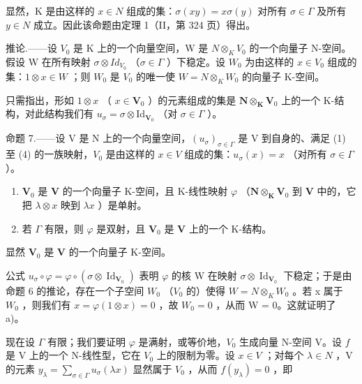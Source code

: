 显然，K 是由这样的 \(x \in N\) 组成的集：\(\sigma(xy) = x\sigma(y)\) 对所有 \(\sigma \in \Gamma\) 及所有 \(y \in N\) 成立。因此该命题由定理 1（II，第 324 页）得出。

推论.——设 \(V_{0}\) 是 K 上的一个向量空间，W 是 \(N \otimes_{K} V_{0}\) 的一个向量子 N-空间。假设 W 在所有映射 \(\sigma \otimes Id_{V_{0}}\) （\(\sigma \in \Gamma\) ）下稳定。设 \(W_{0}\) 为由这样的 \(x \in V_{0}\) 组成的集：\(1 \otimes x \in W\) ；则 \(W_{0}\) 是 \(V_{0}\) 的唯一使 \(W = N \otimes_{K} W_{0}\) 的向量子 K-空间。

只需指出，形如 \(1 \otimes x\) （ \(x \in \mathbf{V}_0\) ）的元素组成的集是 \(\mathbf{N} \otimes_{\mathbf{K}} \mathbf{V}_0\) 上的一个 K-结构，对此结构我们有 \(u_\sigma = \sigma \otimes \mathrm{Id}_{\mathbf{V}_0}\) （对 \(\sigma \in \Gamma\) ）。

命题 7.——设 V 是 N 上的一个向量空间，\((u_{\sigma})_{\sigma \in \Gamma}\) 是 V 到自身的、满足 (1) 至 (4) 的一族映射，\(V_{0}\) 是由这样的 \(x \in V\) 组成的集：\(u_{\sigma}(x) = x\) （对所有 \(\sigma \in \Gamma\) ）。

\begin{enumerate}
\def\labelenumi{\alph{enumi})}
\item
  \(\mathbf{V}_0\) 是 \(\mathbf{V}\) 的一个向量子 K-空间，且 K-线性映射 \(\varphi\) （\(\mathbf{N} \otimes_{\mathbf{K}} \mathbf{V}_0\) 到 \(\mathbf{V}\) 中的，它把 \(\lambda \otimes x\) 映到 \(\lambda x\) ）是单射。
\item
  若 \(\Gamma\) 有限，则 \(\varphi\) 是双射，且 \(\mathbf{V}_0\) 是 \(\mathbf{V}\) 上的一个 K-结构。
\end{enumerate}

显然 \(\mathbf{V}_0\) 是 \(\mathbf{V}\) 的一个向量子 K-空间。

公式 \(u_{\sigma} \circ \varphi = \varphi \circ (\sigma \otimes \operatorname{Id}_{\mathbf{V}_{0}})\) 表明 \(\varphi\) 的核 W 在映射 \(\sigma \otimes \operatorname{Id}_{\mathbf{V}_{0}}\) 下稳定；于是由命题 6 的推论，存在一个子空间 \(W_{0}\) （\(V_{0}\) 的）使得 \(W = N \otimes_{K} W_{0}\) 。若 x 属于 \(W_{0}\) ，则我们有 \(x = \varphi(1 \otimes x) = 0\) ，故 \(W_{0} = 0\) ，从而 W = 0。这就证明了 a)。

现在设 \(\Gamma\) 有限；我们要证明 \(\varphi\) 是满射，或等价地，\(V_0\) 生成向量 N-空间 V。设 \(f\) 是 V 上的一个 N-线性型，它在 \(V_0\) 上的限制为零。设 \(x \in V\) ；对每个 \(\lambda \in N\) ，V 的元素 \(y_\lambda = \sum_{\sigma \in \Gamma} u_\sigma(\lambda x)\) 显然属于 \(V_0\) ，从而 \(f(y_\lambda) = 0\) ，即

